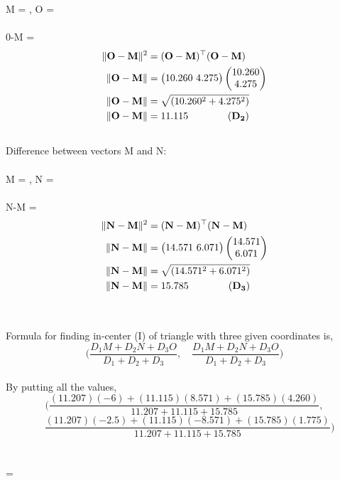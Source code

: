 \documentclass[journal,12pt,twocolumn]{IEEEtran}
\begin{document}
M = , O = \\ \\
0-M = \\
\begin{align*}
\lVert\mathbf{O}-\mathbf{M}\rVert^2 &= (\mathbf{O}-\mathbf{M})^\top (\mathbf{O}-\mathbf{M})\\ \nonumber
\lVert\mathbf{O}-\mathbf{M}\rVert&=\begin{pmatrix}10.260 \ 4.275\end{pmatrix} \begin{pmatrix}10.260\\4.275\end{pmatrix}\\ \nonumber
\lVert\mathbf{O}-\mathbf{M}\rVert&=\sqrt{(10.260^2 + 4.275^2)}\\ \nonumber
\lVert\mathbf{O}-\mathbf{M}\rVert&=11.115 \qquad\qquad (\mathbf{D_2}) \\\nonumber
\end{align*}
Difference between vectors M and N:\\ \\
M = , N = \\ \\
N-M = \\
\begin{align*}
\lVert\mathbf{N}-\mathbf{M}\rVert^2 &= (\mathbf{N}-\mathbf{M})^\top (\mathbf{N}-\mathbf{M})\\ \nonumber
\lVert\mathbf{N}-\mathbf{M}\rVert&=\begin{pmatrix}14.571 \ 6.071\end{pmatrix} \begin{pmatrix}14.571\\6.071\end{pmatrix}\\ \nonumber
\lVert\mathbf{N}-\mathbf{M}\rVert&=\sqrt{(14.571^2 + 6.071^2)}\\ \nonumber
\lVert\mathbf{N}-\mathbf{M}\rVert&=15.785 \qquad\qquad (\mathbf{D_3}) \\ \\\nonumber
\end{align*}
Formula for finding in-center (I) of triangle with three given coordinates is,\\
$$ \bigg(\frac{D_1M + D_2N + D_3O}{D_1+D_2+D_3} ,\quad\frac{D_1M + D_2N + D_3O}{D_1+D_2+D_3}\bigg) $$
\\
By putting all the values,\\
$$ \bigg(\frac{(11.207)(-6) + (11.115)(8.571) + (15.785)(4.260)}{11.207+11.115+15.785} ,$$
$$\quad\frac{(11.207)(-2.5) + (11.115)(-8.571) + (15.785)(1.775)}{11.207+11.115+15.785}\bigg) $$
\\ \\
 = 
\end{document}
